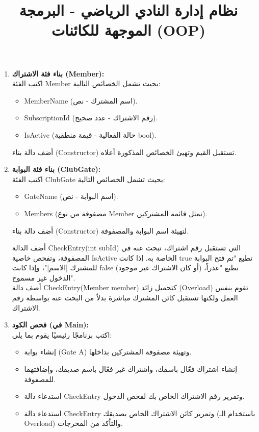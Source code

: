 \documentclass[14pt]{extarticle}
\title{نظام إدارة النادي الرياضي - البرمجة الموجهة للكائنات (OOP)}
\begin{document}
\maketitle
\thispagestyle{fancy}

\begin{enumerate}[itemsep=3em]
    \item
    \textbf{بناء فئة الاشتراك (\textenglish{Member}):} \\
    اكتب الفئة \textenglish{Member} بحيث تشمل الخصائص التالية:
    \begin{itemize}
        \item \textenglish{MemberName} (اسم المشترك - نص).
        \item \textenglish{SubscriptionId} (رقم الاشتراك - عدد صحيح).
        \item \textenglish{IsActive} (حالة الفعالية - قيمة منطقية \textenglish{bool}).
    \end{itemize}
    أضف دالة بناء (Constructor) تستقبل القيم وتهيئ الخصائص المذكورة أعلاه.

    \item
    \textbf{بناء فئة البوابة (\textenglish{ClubGate}):} \\
    اكتب الفئة \textenglish{ClubGate} بحيث تشمل الخصائص التالية:
    \begin{itemize}
        \item \textenglish{GateName} (اسم البوابة - نص).
        \item \textenglish{Members} (مصفوفة من نوع \textenglish{Member} تمثل قائمة المشتركين).
    \end{itemize}
    أضف دالة بناء (Constructor) لتهيئة اسم البوابة والمصفوفة.

    أضف الدالة \textenglish{CheckEntry(int subId)} التي تستقبل رقم اشتراك، تبحث عنه في المصفوفة، وتفحص خاصية \textenglish{IsActive} الخاصة به. إذا كانت \textenglish{true} تطبع "تم فتح البوابة للمشترك [الاسم]"، وإذا كانت \textenglish{false} (أو كان الاشتراك غير موجود) تطبع "عذراً، الدخول غير مسموح". \\

    أضف دالة \textenglish{CheckEntry(Member member)} كتحميل زائد (Overload) تقوم بنفس العمل ولكنها تستقبل كائن المشترك مباشرة بدلاً من البحث عنه بواسطة رقم الاشتراك.

    \item
    \textbf{فحص الكود (في \textenglish{Main}):} \\
    اكتب برنامجًا رئيسيًا يقوم بما يلي:
    \begin{itemize}
        \item إنشاء بوابة (\textenglish{Gate A}) وتهيئة مصفوفة المشتركين بداخلها.
        \item إنشاء اشتراك فعّال باسمك، واشتراك غير فعّال باسم صديقك، وإضافتهما للمصفوفة.
        \item استدعاء دالة \textenglish{CheckEntry} وتمرير رقم الاشتراك الخاص بك لفحص الدخول.
        \item استدعاء دالة \textenglish{CheckEntry} وتمرير كائن الاشتراك الخاص بصديقك (باستخدام الـ Overload) والتأكد من المخرجات.
    \end{itemize}
\end{enumerate}
\end{document}

